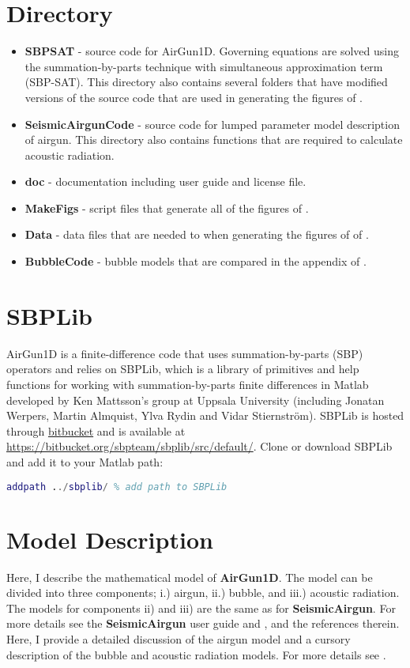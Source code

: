 \documentclass[10pt]{article}
\begin{document}
\section{Directory}
\begin{itemize}
\item{\bf SBPSAT} - source code for AirGun1D. Governing equations are solved using the summation-by-parts technique with simultaneous approximation term (SBP-SAT). This directory also contains several folders that have modified versions of the source code that are used in generating the figures of \citet{Watson2019_airgun}.
\item {\bf SeismicAirgunCode} - source code for lumped parameter model description of airgun. This directory also contains functions that are required to calculate acoustic radiation. 
\item {\bf doc} - documentation including user guide and license file.
\item {\bf MakeFigs} - script files that generate all of the figures of \citet{Watson2019_airgun}.
\item {\bf Data} - data files that are needed to when generating the figures of of \citet{Watson2019_airgun}.
\item {\bf BubbleCode} - bubble models that are compared in the appendix of \citet{Watson2019_airgun}.
\end{itemize}

\section{SBPLib}
AirGun1D is a finite-difference code that uses summation-by-parts (SBP) operators \cite{Svard2014} and relies on SBPLib, which is a library of primitives and help functions for working with summation-by-parts finite differences in Matlab developed by Ken Mattsson's group at Uppsala University (including Jonatan Werpers, Martin Almquist, Ylva Rydin and Vidar Stiernstr\"{o}m). SBPLib is hosted through \href{https:bitbucket.org}{bitbucket} and is available at \href{https://bitbucket.org/sbpteam/sbplib/src/default/}{https://bitbucket.org/sbpteam/sbplib/src/default/}. Clone or download SBPLib and add it to your Matlab path:
\begin{lstlisting}[language=Matlab]
addpath ../sbplib/ % add path to SBPLib
\end{lstlisting}

\section{Model Description}
Here, I describe the mathematical model of {\bf AirGun1D}. The model can be divided into three components; i.) airgun, ii.) bubble, and iii.) acoustic radiation. The models for components ii) and iii) are the same as for {\bf SeismicAirgun}. For more details see the {\bf SeismicAirgun} user guide and \citet{Chelminski2019}, \citet{Watson2016} and the references therein. Here, I provide a detailed discussion of the airgun model and a cursory description of the bubble and acoustic radiation models. For more details see \citet{Watson2019_airgun}.
\end{document}
